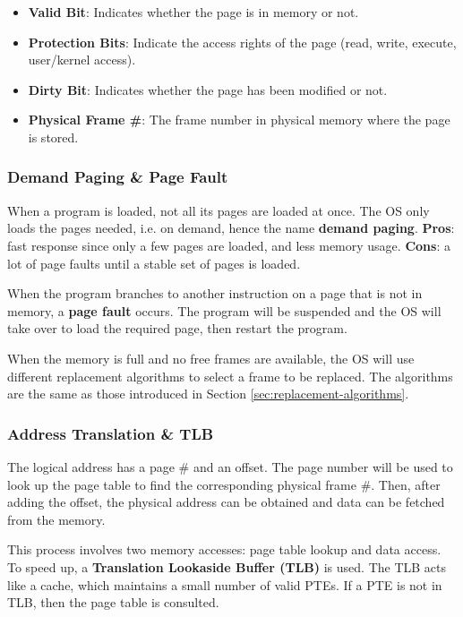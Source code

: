 \begin{itemize}
    \item \textbf{Valid Bit}: Indicates whether the page is in memory or not.
    \item \textbf{Protection Bits}: Indicate the access rights of the page (read, write, execute, user/kernel access).
    \item \textbf{Dirty Bit}: Indicates whether the page has been modified or not.
    \item \textbf{Physical Frame \#}: The frame number in physical memory where the page is stored.
\end{itemize}

\subsubsection{Demand Paging \& Page Fault}

When a program is loaded, not all its pages are loaded at once. The OS only loads
the pages needed, i.e. on demand, hence the name \textbf{demand paging}.
\textbf{Pros}: fast response since only a few pages are loaded, and less memory usage.
\textbf{Cons}: a lot of page faults until a stable set of pages is loaded.

When the program branches to another instruction on a page that is not in memory,
a \textbf{page fault} occurs. The program will be suspended and the OS will take over
to load the required page, then restart the program.

When the memory is full and no free frames are available, the OS will use different
replacement algorithms to select a frame to be replaced. The algorithms are the same
as those introduced in Section \ref{sec:replacement-algorithms}.

\subsubsection{Address Translation \& TLB}

The logical address has a page \# and an offset. The page number will be used to
look up the page table to find the corresponding physical frame \#. Then, after adding
the offset, the physical address can be obtained and data can be fetched from the memory.

This process involves two memory accesses: page table lookup and data access.
To speed up, a \textbf{Translation Lookaside Buffer (TLB)} is used.
The TLB acts like a cache, which maintains a small number of valid PTEs.
If a PTE is not in TLB, then the page table is consulted.


